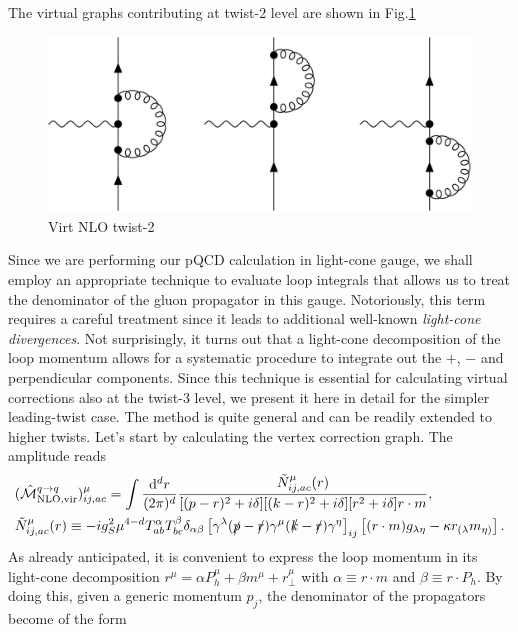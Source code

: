 The virtual graphs contributing at twist-2 level are shown in Fig.\ref{fig:Virt NLO tw2}
\begin{figure}
    \centering
    \includegraphics[width=0.75\linewidth]{fig/VirtNLOTw2.jpg}
    \caption{Virt NLO twist-2}
    \label{fig:Virt NLO tw2}
\end{figure}
\noindent Since we are performing our pQCD calculation in light-cone gauge, we shall employ an appropriate technique to evaluate loop integrals that allows us to treat the denominator of the gluon propagator in this gauge. Notoriously, this term requires a careful treatment since it leads to additional well-known \textit{light-cone divergences}. Not surprisingly, it turns out that a light-cone decomposition of the loop momentum allows for a systematic procedure to integrate out the $+$, $-$ and perpendicular components. Since this technique is essential for calculating virtual corrections also at the twist-3 level, we present it here in detail for the simpler leading-twist case. The method is quite general and can be readily extended to higher twists. Let's start by calculating the vertex correction graph. The amplitude reads
\begin{equation}\label{eq:amplitudevirtualtwist2}
\begin{aligned}
     &(\hat{\mathcal{M}}^{q \to q}_{\text{NLO,vir}})^\mu_{ij,ac} = \int\frac{\dd ^dr}{(2\pi)^d}\frac{\tilde N^\mu_{ij,ac}(r)}{[(p-r)^2+i\delta][(k-r)^2+i\delta][r^2+i\delta]r \cdot m},\\
       & \tilde N^\mu_{ij,ac}(r) \equiv -ig_S^2\mu^{4-d}T^\alpha_{ab} T^\beta_{bc}\delta_{\alpha\beta}\left[\gamma^\lambda(\slashed{p}-\slashed{r})\gamma^\mu(\slashed{k}-\slashed{r})\gamma^\eta\right]_{ij}\left[(r\cdot m)g_{\lambda\eta}-\kappa r_{(\lambda} m_{\eta)}\right].
    \end{aligned}
\end{equation}
As already anticipated, it is convenient to express the loop momentum in its light-cone decomposition $r^\mu = \alpha P_h^\mu+\beta m^\mu+r_\perp^\mu$ with $\alpha\equiv r\cdot m$ and $\beta\equiv r\cdot P_h$. By doing this, given a generic momentum $p_j$, the denominator of the propagators become of the form
